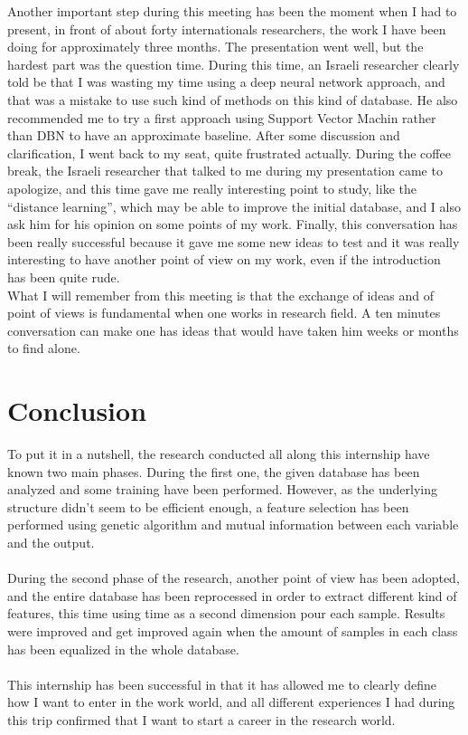 \documentclass{report}
\begin{document}
		Another important step during this meeting has been the moment when I had to present, in front of about forty internationals researchers, the work I have been doing for approximately three months. The presentation went well, but the hardest part was the question time. During this time, an Israeli researcher clearly told be that I was wasting my time using a deep neural network approach, and that was a mistake to use such kind of methods on this kind of database. He also recommended me to try a first approach using Support Vector Machin rather than DBN to have an approximate baseline. After some discussion and clarification, I went back to my seat, quite frustrated actually. During the coffee break, the Israeli researcher that talked to me during my presentation came to apologize, and this time gave me really interesting point to study, like the “distance learning”, which may be able to improve the initial database, and I also ask him for his opinion on some points  of my work. Finally, this conversation has been really successful because it gave me some new ideas to test and it was really interesting to have another point of view on my work, even if the introduction has been quite rude.\\
		
		What I will remember from this meeting is that the exchange of ideas and of point of views is fundamental when one works in research field. A ten minutes conversation can make one has ideas that would have taken him weeks or months to find alone.
		
	\chapter{Conclusion}
	
	To put it in a nutshell, the research conducted all along this internship have known two main phases. During the first one, the given database has been analyzed and some training have been performed. However, as the underlying structure didn't seem to be efficient enough, a feature selection has been performed using genetic algorithm and mutual information between each variable and the output.\\\\
	During the second phase of the research, another point of view has been adopted, and the entire database has been reprocessed in order to extract different kind of features, this time using time as a second dimension pour each sample. Results were improved and get improved again when the amount of samples in each class has been equalized in the whole database.\\\\
	This internship has been successful in that it has allowed me to clearly define how I want to enter in the work world, and all different experiences I had during this trip confirmed that I want to start a career in the research world.
	
	
	
	
	
\end{document}
